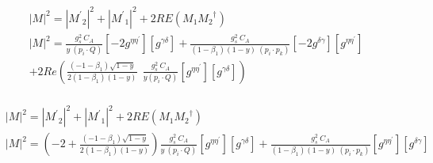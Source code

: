 \begin{equation}
\begin{split}
&|M|^{2}=|{M^{\prime}}_2|^{2}+|{M^{\prime}}_1|^{2}+2RE(M_1{M_2}^{\dagger})\\
&{|{M}|}^2 =\frac{g_s^2\: C_A}{y\:(p_i\cdot Q)}[-2g^{{\eta}{{\eta}^{\prime}}}][g^{{\gamma}{{\delta}}}]+\frac{g_s^2\: C_A}{(1-\beta_1) (1-y)\:(p_i \cdot p_k)}[-2g^{{\delta}{\gamma}}][g^{{\eta}{{\eta}^{\prime}}}]\\
&+2Re(\frac{(-1-\beta_1)\sqrt{1-y}}{2(1-\beta_1)(1-y)}\:\:\frac{g_s^2\: C_A}{y (p_i \cdot Q)}
[g^{{{\eta}}{{\eta}^{\prime}}}][g^{{{\gamma}}{{\delta}}}])  \\
\end{split}
\end{equation}

\begin{equation}
\begin{split}
&|M|^{2}=|{M^{\prime}}_2|^{2}+|{M^{\prime}}_1|^{2}+2RE(M_1{M_2}^{\dagger})\\
&{|{M}|}^2 =(-2+\frac{(-1-\beta_1)\sqrt{1-y}}{2(1-\beta_1)(1-y)})\frac{g_s^2\: C_A}{y\:(p_i\cdot Q)}[g^{{\eta}{{\eta}^{\prime}}}][g^{{\gamma}{{\delta}}}]+\frac{g_s^2\: C_A}{(1-\beta_1) (1-y)\:(p_i \cdot p_k)}[g^{{\eta}{{\eta}^{\prime}}}][g^{{\delta}{\gamma}}]\\
\end{split}
\end{equation}




























